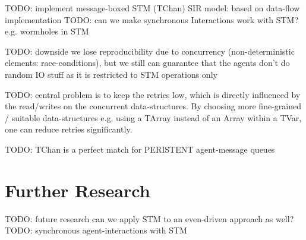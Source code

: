 TODO: implement message-boxed STM (TChan) SIR model: based on data-flow implementation
TODO: can we make synchronous Interactions work with STM? e.g. wormholes in STM

TODO: downside we lose reproducibility due to concurrency (non-deterministic elements: race-conditions), but we still can guarantee that the agents don't do random IO stuff as it is restricted to STM operations only

TODO: central problem is to keep the retries low, which is directly influenced by the read/writes on the concurrent data-structures. By choosing more fine-grained / suitable data-structures e.g. using a TArray instead of an Array within a TVar, one can reduce retries significantly.

TODO: TChan is a perfect match for PERISTENT agent-message queues

\section{Further Research}
\label{sect:stm_further}
TODO: future research can we apply STM to an even-driven approach as well?
TODO: synchronous agent-interactions with STM
